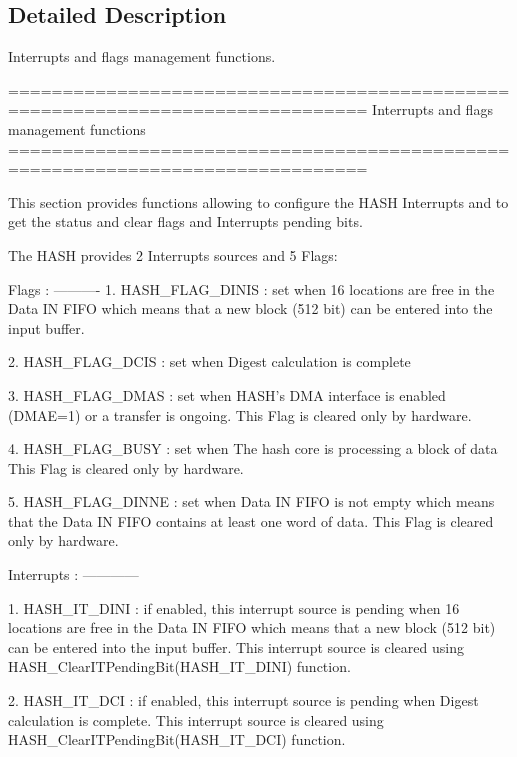 \subsection{Detailed Description}
Interrupts and flags management functions. 

\begin{DoxyVerb} ===============================================================================
                   Interrupts and flags management functions
 ===============================================================================  

  This section provides functions allowing to configure the HASH Interrupts and 
  to get the status and clear flags and Interrupts pending bits.
  
  The HASH provides 2 Interrupts sources and 5 Flags:
  
  Flags :
  ---------- 
     1. HASH_FLAG_DINIS : set when 16 locations are free in the Data IN FIFO 
                          which means that a  new block (512 bit) can be entered 
                          into the input buffer.
                          
     2. HASH_FLAG_DCIS :  set when Digest calculation is complete
      
     3. HASH_FLAG_DMAS :  set when HASH's DMA interface is enabled (DMAE=1) or 
                          a transfer is ongoing.
                          This Flag is cleared only by hardware.
                           
     4. HASH_FLAG_BUSY :  set when The hash core is processing a block of data
                          This Flag is cleared only by hardware. 
                           
     5. HASH_FLAG_DINNE : set when Data IN FIFO is not empty which means that 
                          the Data IN FIFO contains at least one word of data.
                          This Flag is cleared only by hardware.
     
  Interrupts :
  ------------
    
   1. HASH_IT_DINI  : if enabled, this interrupt source is pending when 16 
                      locations are free in the Data IN FIFO  which means that 
                      a new block (512 bit) can be entered into the input buffer.
                      This interrupt source is cleared using 
                      HASH_ClearITPendingBit(HASH_IT_DINI) function.
   
   2. HASH_IT_DCI   : if enabled, this interrupt source is pending when Digest 
                      calculation is complete.
                      This interrupt source is cleared using 
                      HASH_ClearITPendingBit(HASH_IT_DCI) function.


\end{DoxyVerb}
